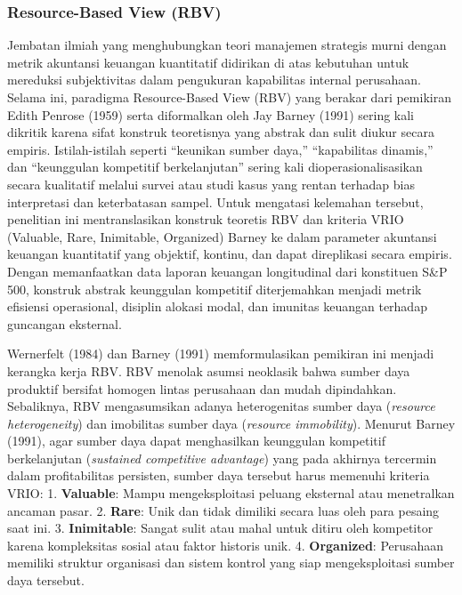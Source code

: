 \documentclass[12pt,a4paper]{article}
\begin{document}
\subsubsection{Resource-Based View (RBV)}\label{resource-based-view-rbv}

Jembatan ilmiah yang menghubungkan teori manajemen strategis murni
dengan metrik akuntansi keuangan kuantitatif didirikan di atas kebutuhan
untuk mereduksi subjektivitas dalam pengukuran kapabilitas internal
perusahaan. Selama ini, paradigma Resource-Based View (RBV) yang berakar
dari pemikiran Edith Penrose (1959) serta diformalkan oleh Jay Barney
(1991) sering kali dikritik karena sifat konstruk teoretisnya yang
abstrak dan sulit diukur secara empiris. Istilah-istilah seperti
``keunikan sumber daya,'' ``kapabilitas dinamis,'' dan ``keunggulan
kompetitif berkelanjutan'' sering kali dioperasionalisasikan secara
kualitatif melalui survei atau studi kasus yang rentan terhadap bias
interpretasi dan keterbatasan sampel. Untuk mengatasi kelemahan
tersebut, penelitian ini mentranslasikan konstruk teoretis RBV dan
kriteria VRIO (Valuable, Rare, Inimitable, Organized) Barney ke dalam
parameter akuntansi keuangan kuantitatif yang objektif, kontinu, dan
dapat direplikasi secara empiris. Dengan memanfaatkan data laporan
keuangan longitudinal dari konstituen S\&P 500, konstruk abstrak
keunggulan kompetitif diterjemahkan menjadi metrik efisiensi
operasional, disiplin alokasi modal, dan imunitas keuangan terhadap
guncangan eksternal.

Wernerfelt (1984) dan Barney (1991) memformulasikan pemikiran ini
menjadi kerangka kerja RBV. RBV menolak asumsi neoklasik bahwa sumber
daya produktif bersifat homogen lintas perusahaan dan mudah dipindahkan.
Sebaliknya, RBV mengasumsikan adanya heterogenitas sumber daya
(\emph{resource heterogeneity}) dan imobilitas sumber daya
(\emph{resource immobility}). Menurut Barney (1991), agar sumber daya
dapat menghasilkan keunggulan kompetitif berkelanjutan (\emph{sustained
competitive advantage}) yang pada akhirnya tercermin dalam
profitabilitas persisten, sumber daya tersebut harus memenuhi kriteria
VRIO: 1. \textbf{Valuable}: Mampu mengeksploitasi peluang eksternal atau
menetralkan ancaman pasar. 2. \textbf{Rare}: Unik dan tidak dimiliki
secara luas oleh para pesaing saat ini. 3. \textbf{Inimitable}: Sangat
sulit atau mahal untuk ditiru oleh kompetitor karena kompleksitas sosial
atau faktor historis unik. 4. \textbf{Organized}: Perusahaan memiliki
struktur organisasi dan sistem kontrol yang siap mengeksploitasi sumber
daya tersebut.
\end{document}
